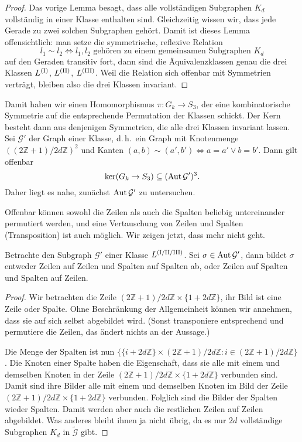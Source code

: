 \begin{proof}
Das vorige Lemma besagt, dass alle vollständigen Subgraphen $K_d$ vollständig in einer Klasse enthalten sind. Gleichzeitig wissen wir, dass jede Gerade zu zwei solchen Subgraphen gehört. Damit ist dieses Lemma offensichtlich: man setze die symmetrische, reflexive Relation
\begin{equation*}
l_1 \sim l_2 \Longleftrightarrow l_1, l_2 \text{ gehören zu einem gemeinsamen Subgraphen } K_d
\end{equation*}
auf den Geraden transitiv fort, dann sind die Äquivalenzklassen genau die drei Klassen $\Lcl(I)$, $\Lcl(II)$, $\Lcl(III)$. Weil die Relation sich offenbar mit Symmetrien verträgt, bleiben also die drei Klassen invariant.
\end{proof}

Damit haben wir einen Homomorphismus $\pi: G_k \to S_3$, der eine kombinatorische Symmetrie auf die entsprechende Permutation der Klassen schickt. Der Kern besteht dann aus denjenigen Symmetrien, die alle drei Klassen invariant lassen. Sei $\mathcal G'$ der Graph einer Klasse, d.\,h.~ein Graph mit Knotenmenge $((2\mathbb Z+1)/2d\mathbb Z)^2$ und Kanten $(a,b) \sim (a',b') \Longleftrightarrow a=a' \vee b=b'$. Dann gilt offenbar
\begin{equation}
\ker(G_k \rightarrow S_3) \subseteq (\operatorname{Aut} \mathcal G')^3.
\end{equation}
Daher liegt es nahe, zunächst $\operatorname{Aut} \mathcal G'$ zu untersuchen.

Offenbar können sowohl die Zeilen als auch die Spalten beliebig untereinander permutiert werden, und eine Vertauschung von Zeilen und Spalten (Transposition) ist auch möglich. Wir zeigen jetzt, dass mehr nicht geht.
\begin{lemma}
Betrachte den Subgraph $\mathcal G'$ einer Klasse $\Lcl(I/II/III)$. Sei $\sigma \in \operatorname{Aut} \mathcal G'$, dann bildet $\sigma$ entweder Zeilen auf Zeilen und Spalten auf Spalten ab, oder Zeilen auf Spalten und Spalten auf Zeilen.
\end{lemma}
\begin{proof}
Wir betrachten die Zeile $(2\mathbb Z+1)/2d\mathbb Z \times \{1 + 2d\mathbb Z\}$, ihr Bild ist eine Zeile oder Spalte. Ohne Beschränkung der Allgemeinheit können wir annehmen, dass sie auf sich selbst abgebildet wird. (Sonst transponiere entsprechend und permutiere die Zeilen, das ändert nichts an der Aussage.)

Die Menge der Spalten ist nun $\{\{i + 2d\mathbb Z\} \times (2\mathbb Z+1)/2d\mathbb Z : i \in (2\mathbb Z+1)/2d\mathbb Z\}$. Die Knoten einer Spalte haben die Eigenschaft, dass sie alle mit einem und demselben Knoten in der Zeile $(2\mathbb Z+1)/2d\mathbb Z \times \{1 + 2d\mathbb Z\}$ verbunden sind. Damit sind ihre Bilder alle mit einem und demselben Knoten im Bild der Zeile $(2\mathbb Z+1)/2d\mathbb Z \times \{1 + 2d\mathbb Z\}$ verbunden. Folglich sind die Bilder der Spalten wieder Spalten. Damit werden aber auch die restlichen Zeilen auf Zeilen abgebildet. Was anderes bleibt ihnen ja nicht übrig, da es nur $2d$ vollständige Subgraphen $K_d$ in $\tilde{\mathcal G}$ gibt.
\end{proof}

